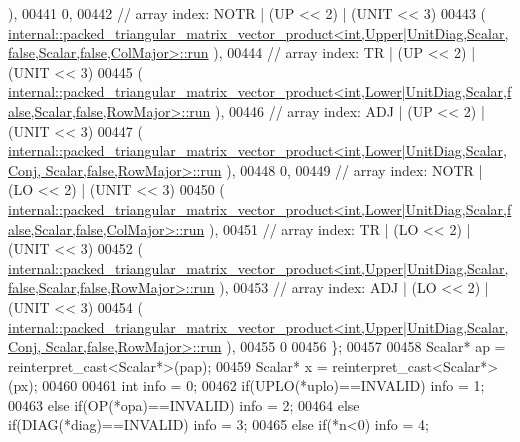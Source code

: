 \begin{DoxyCode}
      ),
00441     0,
00442     \textcolor{comment}{// array index: NOTR  | (UP << 2) | (UNIT  << 3)}
00443     (
      \hyperlink{structinternal_1_1packed__triangular__matrix__vector__product}{
      internal::packed\_triangular\_matrix\_vector\_product<int,Upper|UnitDiag,Scalar,false,Scalar,false,ColMajor>::run}
      ),
00444     \textcolor{comment}{// array index: TR    | (UP << 2) | (UNIT  << 3)}
00445     (
      \hyperlink{structinternal_1_1packed__triangular__matrix__vector__product}{
      internal::packed\_triangular\_matrix\_vector\_product<int,Lower|UnitDiag,Scalar,false,Scalar,false,RowMajor>::run}
      ),
00446     \textcolor{comment}{// array index: ADJ   | (UP << 2) | (UNIT  << 3)}
00447     (
      \hyperlink{structinternal_1_1packed__triangular__matrix__vector__product}{internal::packed\_triangular\_matrix\_vector\_product<int,Lower|UnitDiag,Scalar,Conj,
       Scalar,false,RowMajor>::run}
      ),
00448     0,
00449     \textcolor{comment}{// array index: NOTR  | (LO << 2) | (UNIT  << 3)}
00450     (
      \hyperlink{structinternal_1_1packed__triangular__matrix__vector__product}{
      internal::packed\_triangular\_matrix\_vector\_product<int,Lower|UnitDiag,Scalar,false,Scalar,false,ColMajor>::run}
      ),
00451     \textcolor{comment}{// array index: TR    | (LO << 2) | (UNIT  << 3)}
00452     (
      \hyperlink{structinternal_1_1packed__triangular__matrix__vector__product}{
      internal::packed\_triangular\_matrix\_vector\_product<int,Upper|UnitDiag,Scalar,false,Scalar,false,RowMajor>::run}
      ),
00453     \textcolor{comment}{// array index: ADJ   | (LO << 2) | (UNIT  << 3)}
00454     (
      \hyperlink{structinternal_1_1packed__triangular__matrix__vector__product}{internal::packed\_triangular\_matrix\_vector\_product<int,Upper|UnitDiag,Scalar,Conj,
       Scalar,false,RowMajor>::run}
      ),
00455     0
00456   \};
00457 
00458   Scalar* ap = \textcolor{keyword}{reinterpret\_cast<}Scalar*\textcolor{keyword}{>}(pap);
00459   Scalar* x = \textcolor{keyword}{reinterpret\_cast<}Scalar*\textcolor{keyword}{>}(px);
00460 
00461   \textcolor{keywordtype}{int} info = 0;
00462   \textcolor{keywordflow}{if}(UPLO(*uplo)==INVALID)                                            info = 1;
00463   \textcolor{keywordflow}{else} \textcolor{keywordflow}{if}(OP(*opa)==INVALID)                                          info = 2;
00464   \textcolor{keywordflow}{else} \textcolor{keywordflow}{if}(DIAG(*diag)==INVALID)                                       info = 3;
00465   \textcolor{keywordflow}{else} \textcolor{keywordflow}{if}(*n<0)                                                       info = 4;

\end{DoxyCode}
